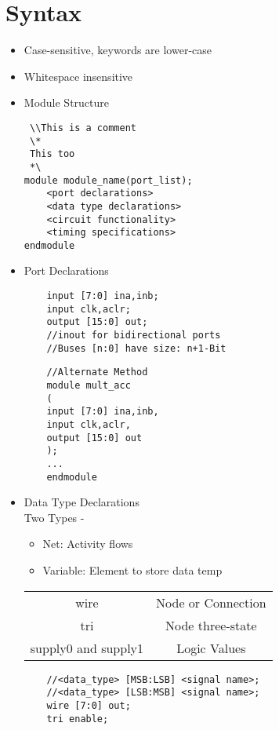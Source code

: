 \documentclass{article}
\begin{document}
\section{Syntax}
\begin{itemize}
    \item Case-sensitive, keywords are lower-case
    \item Whitespace insensitive

\item Module Structure
 \begin{lstlisting}
 \\This is a comment
 \*
 This too
 *\
module module_name(port_list);
    <port declarations>
    <data type declarations>
    <circuit functionality>
    <timing specifications>
endmodule
\end{lstlisting}

\item Port Declarations
\begin{lstlisting}
    input [7:0] ina,inb;
    input clk,aclr;
    output [15:0] out;
    //inout for bidirectional ports
    //Buses [n:0] have size: n+1-Bit
\end{lstlisting}
\begin{lstlisting}
    //Alternate Method
    module mult_acc
    (
    input [7:0] ina,inb,
    input clk,aclr,
    output [15:0] out
    );
    ...
    endmodule
\end{lstlisting}

\item Data Type Declarations\\
Two Types - 
    \begin{itemize}
        \item Net: Activity flows
        \item Variable: Element to store data temp
    \end{itemize}

\begin{center}
\begin{tabular}{ |c|c| } 
 \hline
 wire & Node or Connection  \\ 
 tri & Node three-state  \\ 
 supply0 and supply1 & Logic Values  \\ 
 \hline
\end{tabular}
\end{center}

\begin{lstlisting}
    //<data_type> [MSB:LSB] <signal name>;
    //<data_type> [LSB:MSB] <signal name>;
    wire [7:0] out;
    tri enable;
\end{lstlisting}


\end{itemize}
\end{document}
